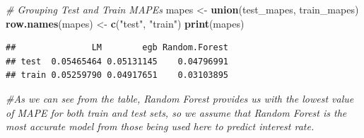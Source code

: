 \documentclass[]{article}
\newenvironment{Shaded}{\begin{snugshade}}{\end{snugshade}}
\newcommand{\CommentTok}[1]{\textcolor[rgb]{0.56,0.35,0.01}{\textit{#1}}}
\newcommand{\KeywordTok}[1]{\textcolor[rgb]{0.13,0.29,0.53}{\textbf{#1}}}
\newcommand{\NormalTok}[1]{#1}
\newcommand{\OperatorTok}[1]{\textcolor[rgb]{0.81,0.36,0.00}{\textbf{#1}}}
\newcommand{\StringTok}[1]{\textcolor[rgb]{0.31,0.60,0.02}{#1}}
\begin{document}
\begin{Shaded}
\end{Shaded}

\begin{Shaded}
\begin{Highlighting}[]
\CommentTok{# Grouping Test and Train MAPEs}
\NormalTok{mapes <-}\StringTok{ }\KeywordTok{union}\NormalTok{(test_mapes, train_mapes)}
\KeywordTok{row.names}\NormalTok{(mapes) <-}\StringTok{ }\KeywordTok{c}\NormalTok{(}\StringTok{"test"}\NormalTok{, }\StringTok{"train"}\NormalTok{)}
\KeywordTok{print}\NormalTok{(mapes)}
\end{Highlighting}
\end{Shaded}

\begin{verbatim}
##               LM        egb Random.Forest
## test  0.05465464 0.05131145    0.04796991
## train 0.05259790 0.04917651    0.03103895
\end{verbatim}

\begin{Shaded}
\begin{Highlighting}[]
\CommentTok{#As we can see from the table, Random Forest provides us with the lowest value of MAPE for both train and test sets, so we assume that Random Forest is the most accurate model from those being used here to predict interest rate.}
\end{Highlighting}
\end{Shaded}
\end{document}
